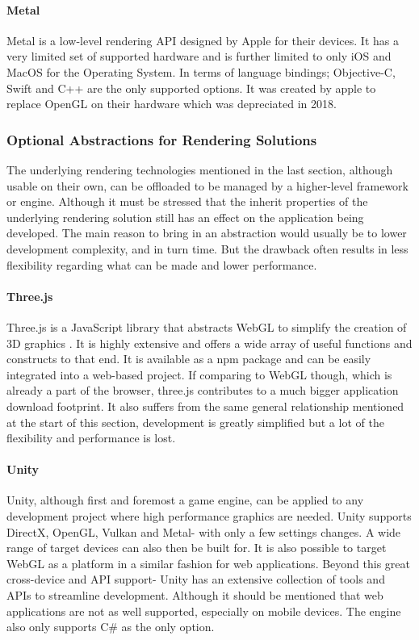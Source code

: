 \paragraph{Metal}
Metal is a low-level rendering API designed by Apple for their devices. It has a very limited set of supported hardware and is further limited to only iOS and MacOS for the Operating System. In terms of language bindings; Objective-C, Swift and C++ are the only supported options. \cite[]{apple_metal} It was created by apple to replace OpenGL on their hardware which was depreciated in 2018. \cite[]{apple_apple}

\subsubsection{Optional Abstractions for Rendering Solutions}
The underlying rendering technologies mentioned in the last section, although usable on their own, can be offloaded to be managed by a higher-level framework or engine. Although it must be stressed that the inherit properties of the underlying rendering solution still has an effect on the application being developed.
The main reason to bring in an abstraction would usually be to lower development complexity, and in turn time. But the drawback often results in less flexibility regarding what can be made and lower performance.

\paragraph{Three.js}
Three.js is a JavaScript library that abstracts WebGL to simplify the creation of 3D graphics \cite[]{mrdoob_threejs}. It is highly extensive and offers a wide array of useful functions and constructs to that end. It is available as a npm package \cite[]{threejsorg_threejs} and can be easily integrated into a web-based project. If comparing to WebGL though, which is already a part of the browser, three.js contributes to a much bigger application download footprint. It also suffers from the same general relationship mentioned at the start of this section, development is greatly simplified but a lot of the flexibility and performance is lost.

\paragraph{Unity}
Unity, although first and foremost a game engine, can be applied to any development project where high performance graphics are needed. Unity supports DirectX, OpenGL, Vulkan and Metal- with only a few settings changes. A wide range of target devices can also then be built for. It is also possible to target WebGL as a platform in a similar fashion for web applications. Beyond this great cross-device and API support- Unity has an extensive collection of tools and APIs to streamline development. Although it should be mentioned that web applications are not as well supported, especially on mobile devices. The engine also only supports C\# as the only option. \cite[]{Nicoll2019} \cite[]{unitytechnologies_unity}

